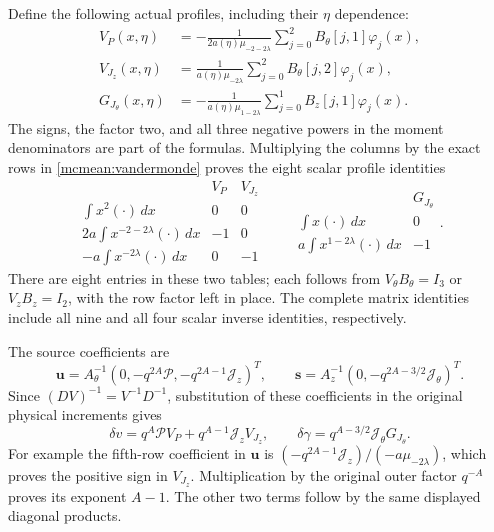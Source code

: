 \documentclass[11pt]{article}
\begin{document}
Define the following actual profiles, including their \(\eta\) dependence:
\begin{equation}\label{mcmean:profiles}
\begin{split}
 V_P(x,\eta)&=-\frac{1}{2a(\eta)\mu_{-2-2\lambda}}
                   \sum_{j=0}^2B_\theta[j,1]\varphi_j(x),\\
 V_{J_z}(x,\eta)&=\frac{1}{a(\eta)\mu_{-2\lambda}}
                   \sum_{j=0}^2B_\theta[j,2]\varphi_j(x),\\
 G_{J_\theta}(x,\eta)&=-\frac{1}{a(\eta)\mu_{1-2\lambda}}
                   \sum_{j=0}^1B_z[j,1]\varphi_j(x).
\end{split}
\end{equation}
The signs, the factor two, and all three negative powers in the moment
denominators are part of the formulas. Multiplying the columns by
the exact rows in \eqref{mcmean:vandermonde} proves the eight scalar
profile identities
\begin{equation}\label{mcmean:profile_moments}
\begin{array}{c|cc}
 &V_P&V_{J_z}\\ \hline
 \int x^2(\cdot)\,dx&0&0\\
 2a\int x^{-2-2\lambda}(\cdot)\,dx&-1&0\\
 -a\int x^{-2\lambda}(\cdot)\,dx&0&-1
\end{array}
\qquad
\begin{array}{c|c}
 &G_{J_\theta}\\ \hline
 \int x(\cdot)\,dx&0\\
 a\int x^{1-2\lambda}(\cdot)\,dx&-1
\end{array}.
\end{equation}
There are eight entries in these two tables; each follows from
\(V_\theta B_\theta=I_3\) or \(V_zB_z=I_2\), with the row factor
left in place. The complete matrix identities include all nine and
all four scalar inverse identities, respectively.

The source coefficients are
\[
 \boldsymbol u=A_\theta^{-1}
       (0,-q^{2A}\mathcal P,-q^{2A-1}\mathcal J_z)^T,
 \qquad
 \boldsymbol s=A_z^{-1}
       (0,-q^{2A-3/2}\mathcal J_\theta)^T.
\]
Since \((DV)^{-1}=V^{-1}D^{-1}\), substitution of these coefficients
in the original physical increments gives
\begin{equation}\label{mcmean:tangential_increment}
 \delta v=q^A\mathcal P V_P+q^{A-1}\mathcal J_zV_{J_z},
 \qquad
 \delta\gamma=q^{A-3/2}\mathcal J_\theta G_{J_\theta}.
\end{equation}
For example the fifth-row coefficient in \(\boldsymbol u\) is
\((-q^{2A-1}\mathcal J_z)/(-a\mu_{-2\lambda})\), which proves
the positive sign in \(V_{J_z}\). Multiplication by the original
outer factor \(q^{-A}\) proves its exponent \(A-1\).
The other two terms follow by the same displayed diagonal products.
\end{document}
